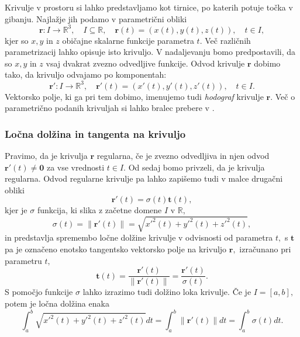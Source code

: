 \documentclass[12pt,a4paper,twoside]{article}
\theoremstyle{definition} %
\theoremstyle{plain} %
\theoremstyle{primerstyle}
\numberwithin{equation}{section}  %
\newcommand{\R}{\mathbb R}
\newcommand{\tV}{\mathbf{t}}
\newcommand{\rV}{\mathbf{r}}
\begin{document}
Krivulje v prostoru si lahko predstavljamo kot tirnice, po katerih potuje točka v gibanju. Najlažje jih podamo
v parametrični obliki
\begin{equation*}
\rV:I \to \R^3,\quad I \subseteq \R, \quad \rV(t)=(x(t),y(t),z(t)), \quad t \in I,
\end{equation*}
kjer so 
$x,y$ in $z$ običajne skalarne funkcije parametra $t.$ Več različnih parametrizacij lahko opisuje
isto krivuljo. V nadaljevanju bomo predpostavili, da so $x,y$ in $z$ vsaj dvakrat zvezno odvedljive funkcije.
Odvod krivulje $\rV$ dobimo tako, da krivuljo odvajamo po komponentah:
$$\rV':I \to \R^3, \quad \rV'(t)=(x'(t),y'(t),z'(t)), \quad t \in I.$$
Vektorsko polje, ki ga pri tem dobimo, imenujemo tudi \textit{hodograf} krivulje $\rV.$ Več o parametrično podanih krivuljah si lahko bralec prebere v \cite{struik1961lectures}.

\subsubsection{Ločna dolžina in tangenta na krivuljo}

Pravimo, da je krivulja $\rV$ regularna, če je zvezno odvedljiva in njen odvod $\rV'(t) \neq \bm{0}$ za vse vrednosti $t \in I.$ Od sedaj bomo privzeli, da je krivulja regularna. Odvod regularne krivulje pa lahko zapišemo tudi v malce drugačni obliki
\begin{equation}
	\label{eq2_1}
	\rV'(t)=\sigma(t)\tV(t),
\end{equation}
kjer je $\sigma$ funkcija, ki slika z začetne domene $I$ v $\R,$
\begin{equation}
	\sigma(t)=\lVert \rV'(t)\rVert=\sqrt{x'^2(t)+y'^2(t)+z'^2(t)},
\end{equation}
in predstavlja spremembo ločne dolžine krivulje v odvisnosti od parametra $t,$ s $\tV$ pa je označeno enotsko tangentsko vektorsko polje na krivuljo $\rV,$ izračunano pri parametru $t,$
\begin{equation}
	\label{enotski_tangentni_vektor}
	\tV(t)=\frac{\rV'(t)}{\lVert \rV'(t) \rVert}=
	\frac{\rV'(t)}{\sigma(t)}.
\end{equation}
S pomočjo funkcije $\sigma$ lahko izrazimo tudi dolžino loka krivulje. Če je $I=[a,b],$ potem je ločna dolžina enaka
\begin{equation}
	\int_a^b\sqrt{x'^2(t)+y'^2(t)+z'^2(t)}dt=\int_a^b\lVert \rV'(t) \rVert dt =\int_a^b\sigma(t)dt.
\end{equation}
\end{document}
